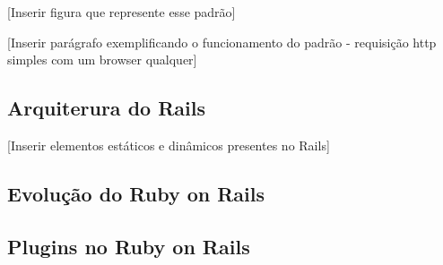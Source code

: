[Inserir figura que represente esse padrão]

[Inserir parágrafo exemplificando o funcionamento do padrão - requisição http simples com um browser qualquer]


\subsection{Arquiterura do Rails}

[Inserir elementos estáticos e dinâmicos presentes no Rails]


\subsection{Evolução do Ruby on Rails}



\subsection{Plugins no Ruby on Rails}